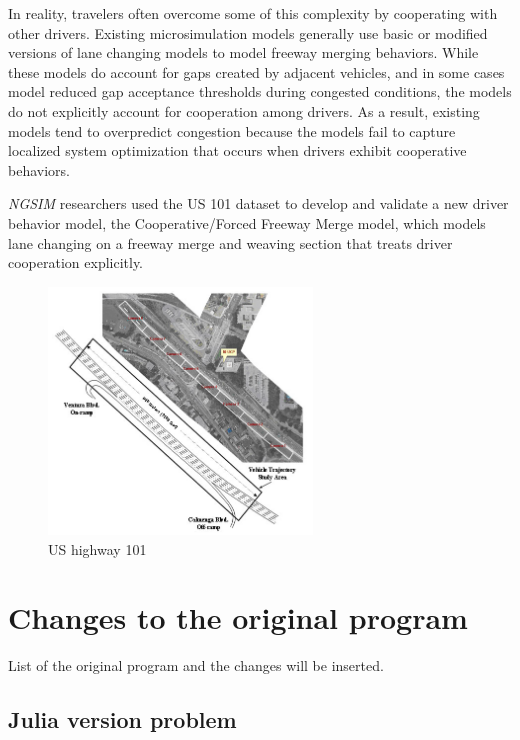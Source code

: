 In reality, travelers often overcome some of this complexity by cooperating with other drivers. Existing microsimulation models generally use basic or modified versions of lane changing models to model freeway merging behaviors. While these models do account for gaps created by adjacent vehicles, and in some cases model reduced gap acceptance thresholds during congested conditions, the models do not explicitly account for cooperation among drivers. As a result, existing models tend to overpredict congestion because the models fail to capture localized system optimization that occurs when drivers exhibit cooperative behaviors.

{\it NGSIM} researchers used the US 101 dataset to develop and validate a new driver behavior model, the Cooperative/Forced Freeway Merge model, which models lane changing on a freeway merge and weaving section that treats driver cooperation explicitly.

\begin{figure}[H]
\begin{center}
\includegraphics[width=7cm]{./figures/07030fig1.jpg}
\caption{US highway 101}
\label{fig:pict_us101}
\end{center}
\end{figure}







\section{Changes to the original program}


List of the original program and the changes will be inserted.


\subsection{Julia version problem}

